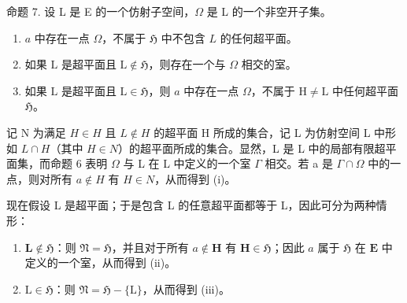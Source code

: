 命题 7. 设 L 是 E 的一个仿射子空间，\(\Omega\) 是 L 的一个非空开子集。

\begin{enumerate}
\def\labelenumi{(\roman{enumi})}
\item
  \(a\) 中存在一点 \(\Omega\)，不属于 \(\mathfrak{H}\) 中不包含 \(L\) 的任何超平面。
\item
  如果 \(\mathrm{L}\) 是超平面且 \(\mathrm{L} \notin \mathfrak{H}\)，则存在一个与 \(\Omega\) 相交的室。
\item
  如果 \(\mathrm{L}\) 是超平面且 \(\mathrm{L} \in \mathfrak{H}\)，则 \(a\) 中存在一点 \(\Omega\)，不属于 \(\mathrm{H} \neq \mathrm{L}\) 中任何超平面 \(\mathfrak{H}\)。
\end{enumerate}

记 N 为满足 \(H \in H\) 且 \(L \notin H\) 的超平面 H 所成的集合，记 L 为仿射空间 L 中形如 \(L \cap H\)（其中 \(H \in N\)）的超平面所成的集合。显然，L 是 L 中的局部有限超平面集，而命题 6 表明 \(\Omega\) 与 L 在 L 中定义的一个室 \(\Gamma\) 相交。若 a 是 \(\Gamma \cap \Omega\) 中的一点，则对所有 \(a \notin H\) 有 \(H \in N\)，从而得到 (i)。

现在假设 L 是超平面；于是包含 L 的任意超平面都等于 L，因此可分为两种情形：

\begin{enumerate}
\def\labelenumi{\alph{enumi})}
\item
  \(\mathbf{L} \notin \mathfrak{H}\)：则 \(\mathfrak{N} = \mathfrak{H}\)，并且对于所有 \(a \notin \mathbf{H}\) 有 \(\mathbf{H} \in \mathfrak{H}\)；因此 \(a\) 属于 \(\mathfrak{H}\) 在 \(\mathbf{E}\) 中定义的一个室，从而得到 (ii)。
\item
  \(\mathrm{L} \in \mathfrak{H}\)：则 \(\mathfrak{N} = \mathfrak{H} - \{\mathrm{L}\}\)，从而得到 (iii)。
\end{enumerate}

